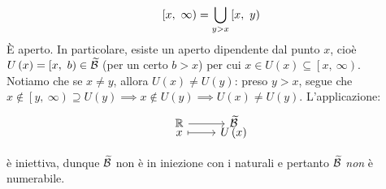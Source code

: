 \begin{example}
\begin{itemize}
\begin{equation*}
\left[x,\ \infty\right)=\union_{y>x}\left[x,\ y\right)
\end{equation*}
È aperto. In particolare, esiste un aperto dipendente dal punto $x$, cioè $U\left(x\right)=\left[x,\ b\right)\in\widetilde{\basis}$ (per un certo $b>x$) per cui $x\in U\left(x\right)\subseteq\left[x,\ \infty\right)$.\\
Notiamo che se $x\neq y$, allora $U\left(x\right)\neq U\left(y\right)$: preso $y>x$, segue che $x\notin \left[y,\ \infty\right)\supseteq U\left(y\right)\implies x\notin U\left(y\right)\implies U\left(x\right)\neq U\left(y\right)$. L'applicazione:
\begin{equation}
\funztot{\ }{\realset}{\widetilde{\basis}}{x}{U\left(x\right)}
\end{equation}
\end{itemize}
è iniettiva, dunque $\widetilde{\mathcal{B}}$ non è in iniezione con i naturali e pertanto $\widetilde{\mathcal{B}}$ \textit{non} è numerabile.
\end{example}
\begin{center}
\end{center}
